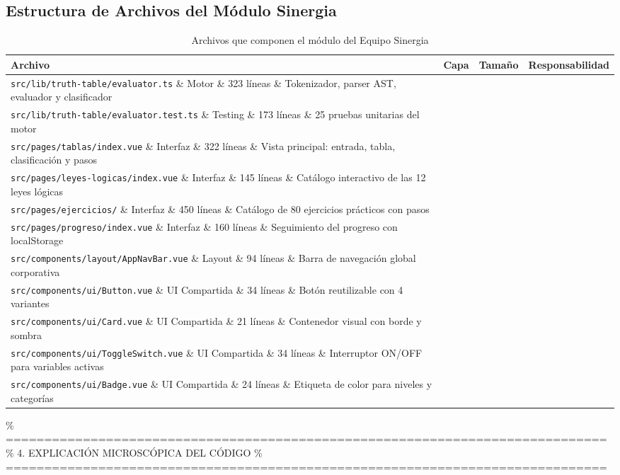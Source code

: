 \documentclass[11pt,a4paper]{article}
\begin{document}
\subsection{Estructura de Archivos del Módulo Sinergia}
\begin{table}[H]
\centering
\caption{Archivos que componen el módulo del Equipo Sinergia}
\label{tab:archivos}
\small
\begin{tabularx}{\textwidth}{llcX}
\toprule
\textbf{Archivo} & \textbf{Capa} & \textbf{Tamaño} & \textbf{Responsabilidad} \\
\midrule
\texttt{src/lib/truth-table/evaluator.ts} \& Motor \& 323 líneas \& Tokenizador, parser AST, evaluador y clasificador \\
\texttt{src/lib/truth-table/evaluator.test.ts} \& Testing \& 173 líneas \& 25 pruebas unitarias del motor \\
\texttt{src/pages/tablas/index.vue} \& Interfaz \& 322 líneas \& Vista principal: entrada, tabla, clasificación y pasos \\
\texttt{src/pages/leyes-logicas/index.vue} \& Interfaz \& 145 líneas \& Catálogo interactivo de las 12 leyes lógicas \\
\texttt{src/pages/ejercicios/} \& Interfaz \& 450 líneas \& Catálogo de 80 ejercicios prácticos con pasos \\
\texttt{src/pages/progreso/index.vue} \& Interfaz \& 160 líneas \& Seguimiento del progreso con localStorage \\
\texttt{src/components/layout/AppNavBar.vue} \& Layout \& 94 líneas \& Barra de navegación global corporativa \\
\texttt{src/components/ui/Button.vue} \& UI Compartida \& 34 líneas \& Botón reutilizable con 4 variantes \\
\texttt{src/components/ui/Card.vue} \& UI Compartida \& 21 líneas \& Contenedor visual con borde y sombra \\
\texttt{src/components/ui/ToggleSwitch.vue} \& UI Compartida \& 34 líneas \& Interruptor ON/OFF para variables activas \\
\texttt{src/components/ui/Badge.vue} \& UI Compartida \& 24 líneas \& Etiqueta de color para niveles y categorías \\
\bottomrule
\end{tabularx}
\end{table}

\% ==============================================================================
\% 4. EXPLICACIÓN MICROSCÓPICA DEL CÓDIGO
\% ==============================================================================
\end{document}
